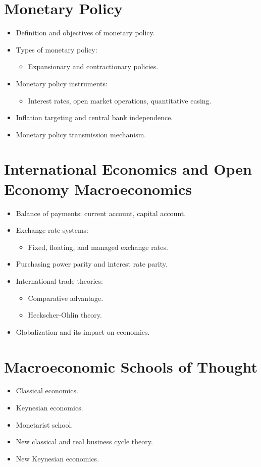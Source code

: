 \section{Monetary Policy}
\begin{itemize}
    \item Definition and objectives of monetary policy.
    \item Types of monetary policy:
    \begin{itemize}
        \item Expansionary and contractionary policies.
    \end{itemize}
    \item Monetary policy instruments:
    \begin{itemize}
        \item Interest rates, open market operations, quantitative easing.
    \end{itemize}
    \item Inflation targeting and central bank independence.
    \item Monetary policy transmission mechanism.
\end{itemize}

\section{International Economics and Open Economy Macroeconomics}
\begin{itemize}
    \item Balance of payments: current account, capital account.
    \item Exchange rate systems:
    \begin{itemize}
        \item Fixed, floating, and managed exchange rates.
    \end{itemize}
    \item Purchasing power parity and interest rate parity.
    \item International trade theories:
    \begin{itemize}
        \item Comparative advantage.
        \item Heckscher-Ohlin theory.
    \end{itemize}
    \item Globalization and its impact on economies.
\end{itemize}

\section{Macroeconomic Schools of Thought}
\begin{itemize}
    \item Classical economics.
    \item Keynesian economics.
    \item Monetarist school.
    \item New classical and real business cycle theory.
    \item New Keynesian economics.
\end{itemize}

